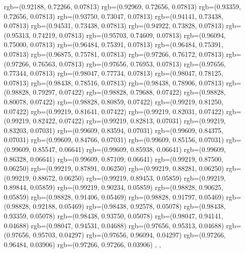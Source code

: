 {{{			rgb=(0.92188, 0.72266, 0.07813)
			rgb=(0.92969, 0.72656, 0.07813)
			rgb=(0.93359, 0.72656, 0.07813)
			rgb=(0.93750, 0.73047, 0.07813)
			rgb=(0.94141, 0.73438, 0.07813)
			rgb=(0.94531, 0.73438, 0.07813)
			rgb=(0.94922, 0.73828, 0.07813)
			rgb=(0.95313, 0.74219, 0.07813)
			rgb=(0.95703, 0.74609, 0.07813)
			rgb=(0.96094, 0.75000, 0.07813)
			rgb=(0.96484, 0.75391, 0.07813)
			rgb=(0.96484, 0.75391, 0.07813)
			rgb=(0.96875, 0.75781, 0.07813)
			rgb=(0.97266, 0.76172, 0.07813)
			rgb=(0.97266, 0.76563, 0.07813)
			rgb=(0.97656, 0.76953, 0.07813)
			rgb=(0.97656, 0.77344, 0.07813)
			rgb=(0.98047, 0.77734, 0.07813)
			rgb=(0.98047, 0.78125, 0.07813)
			rgb=(0.98438, 0.78516, 0.07813)
			rgb=(0.98438, 0.78906, 0.07813)
			rgb=(0.98828, 0.79297, 0.07422)
			rgb=(0.98828, 0.79688, 0.07422)
			rgb=(0.98828, 0.80078, 0.07422)
			rgb=(0.98828, 0.80859, 0.07422)
			rgb=(0.99219, 0.81250, 0.07422)
			rgb=(0.99219, 0.81641, 0.07422)
			rgb=(0.99219, 0.82031, 0.07422)
			rgb=(0.99219, 0.82422, 0.07422)
			rgb=(0.99219, 0.82813, 0.07031)
			rgb=(0.99219, 0.83203, 0.07031)
			rgb=(0.99609, 0.83594, 0.07031)
			rgb=(0.99609, 0.84375, 0.07031)
			rgb=(0.99609, 0.84766, 0.07031)
			rgb=(0.99609, 0.85156, 0.07031)
			rgb=(0.99609, 0.85547, 0.06641)
			rgb=(0.99609, 0.85938, 0.06641)
			rgb=(0.99609, 0.86328, 0.06641)
			rgb=(0.99609, 0.87109, 0.06641)
			rgb=(0.99219, 0.87500, 0.06250)
			rgb=(0.99219, 0.87891, 0.06250)
			rgb=(0.99219, 0.88281, 0.06250)
			rgb=(0.99219, 0.88672, 0.06250)
			rgb=(0.99219, 0.89453, 0.05859)
			rgb=(0.99219, 0.89844, 0.05859)
			rgb=(0.99219, 0.90234, 0.05859)
			rgb=(0.98828, 0.90625, 0.05859)
			rgb=(0.98828, 0.91406, 0.05469)
			rgb=(0.98828, 0.91797, 0.05469)
			rgb=(0.98828, 0.92188, 0.05469)
			rgb=(0.98438, 0.92578, 0.05078)
			rgb=(0.98438, 0.93359, 0.05078)
			rgb=(0.98438, 0.93750, 0.05078)
			rgb=(0.98047, 0.94141, 0.04688)
			rgb=(0.98047, 0.94531, 0.04688)
			rgb=(0.97656, 0.95313, 0.04688)
			rgb=(0.97656, 0.95703, 0.04297)
			rgb=(0.97656, 0.96094, 0.04297)
			rgb=(0.97266, 0.96484, 0.03906)
			rgb=(0.97266, 0.97266, 0.03906)
		},
	},
}

\endinput

